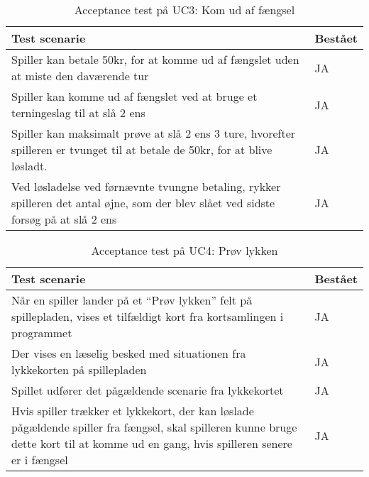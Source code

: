 \documentclass[class=article, crop=false]{standalone}
\begin{document}
    \begin{table}[H]
        \caption{Acceptance test på UC3: Kom ud af fængsel}
        \begin{tabularx}{\textwidth}{|X|l|}
            \hline
            \textbf{Test scenarie}       & \textbf{Bestået}   \\ \hline
            Spiller kan betale 50kr, for at komme ud af fængslet uden at miste den daværende tur & JA \\ \hline
            Spiller kan komme ud af fængslet ved at bruge et terningeslag til at slå 2 ens& JA \\ \hline
            Spiller kan maksimalt prøve at slå 2 ens 3 ture, hvorefter spilleren er tvunget til at betale de 50kr, for at blive løsladt. & JA \\ \hline
            Ved løsladelse ved førnævnte tvungne betaling, rykker spilleren det antal øjne, som der blev slået ved sidste forsøg på at slå 2 ens  & JA \\ \hline
        \end{tabularx}
    \end{table}

    \begin{table}[H]
        \caption{Acceptance test på UC4: Prøv lykken}
        \begin{tabularx}{\textwidth}{|X|l|}
            \hline
            \textbf{Test scenarie}       & \textbf{Bestået}   \\ \hline
            Når en spiller lander på et “Prøv lykken” felt på spillepladen, vises et tilfældigt kort fra kortsamlingen i programmet & JA \\ \hline
            Der vises en læselig besked med situationen fra lykkekorten på spillepladen & JA \\ \hline
            Spillet udfører det pågældende scenarie fra lykkekortet  & JA  \\ \hline
            Hvis spiller trækker et lykkekort, der kan løslade pågældende spiller fra fængsel, skal spilleren kunne bruge dette kort til at komme ud en gang, hvis spilleren senere er i fængsel  & JA \\ \hline
        \end{tabularx}
    \end{table}
\end{document}
